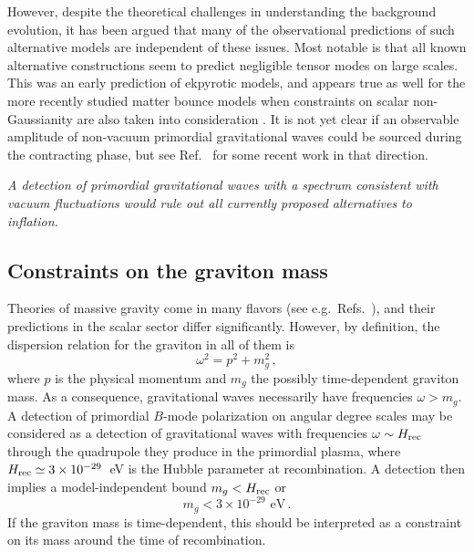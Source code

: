However, despite the theoretical challenges in understanding the background evolution, it has been argued that many 
of the observational predictions of such alternative models are independent of these issues.
Most notable is that all known alternative constructions seem to predict negligible tensor modes on large scales.
This was an early prediction of ekpyrotic models, and appears true as well for the more recently 
studied matter bounce models when constraints on scalar non-Gaussianity are also taken into consideration \cite{Quintin:2015rta}. It is not yet clear if an observable amplitude of non-vacuum primordial gravitational waves could be sourced during the contracting phase, but see Ref.~\cite{Ben-Dayan:2016iks} for some recent work in that direction.

{\it A detection of primordial gravitational waves with a spectrum consistent with vacuum fluctuations would rule out all currently proposed alternatives to inflation.}

\subsection{Constraints on the graviton mass}

Theories of massive gravity come in many flavors (see e.g.\ Refs.~\cite{Dubovsky:2004sg,Hinterbichler:2011tt}), and their predictions in the scalar sector differ significantly. However, by definition, the dispersion relation for the graviton in all of them is
\begin{equation}
\omega^2=p^2+m_g^2\,,
\end{equation}
where $p$ is the physical momentum and $m_g$ the possibly time-dependent graviton mass. As a consequence, gravitational waves necessarily have frequencies $\omega>m_g$. A detection of primordial $B$-mode polarization on angular degree scales may be considered as a detection of gravitational waves with frequencies $\omega\sim H_{\rm rec}$ through the quadrupole they produce in the primordial plasma, where $H_{\rm rec}\simeq 3\times 10^{-29}$~eV is the Hubble parameter at recombination. A detection then implies a model-independent bound $m_g<H_{\rm rec}$ or 
\begin{equation}
m_g< 3\times 10^{-29}{\mbox{ eV}}\,.
\end{equation}
If the graviton mass is time-dependent, this should be interpreted as a constraint on its mass around the time of recombination.

